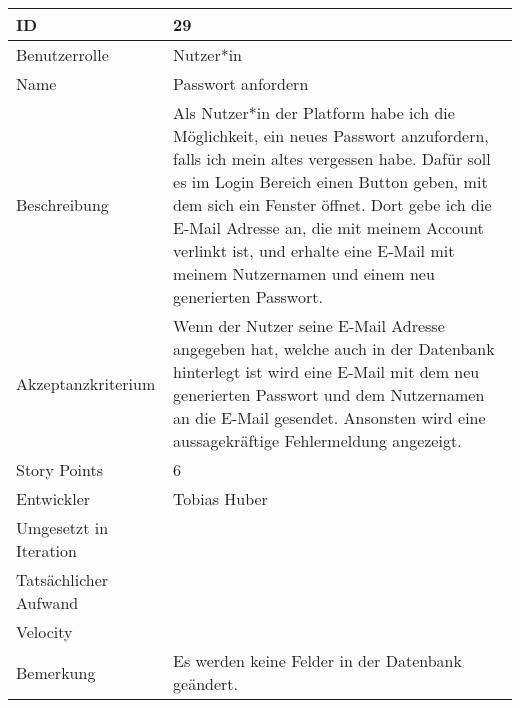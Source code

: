\begin{tabularx}{\textwidth}{|p{}|X|}
	\hline
	ID & 29 \\
	\hline
	Benutzerrolle & Nutzer*in \\
	\hline
	Name & Passwort anfordern\\
	\hline
	Beschreibung & Als Nutzer*in der Platform habe ich die Möglichkeit, ein neues Passwort anzufordern, falls ich mein altes vergessen habe. Dafür soll es im Login Bereich einen Button geben, mit dem sich ein Fenster öffnet. Dort gebe ich die E-Mail Adresse an, die mit meinem Account verlinkt ist, und erhalte eine E-Mail mit meinem Nutzernamen und einem neu generierten Passwort. \\
	\hline
	Akzeptanzkriterium & Wenn der Nutzer seine E-Mail Adresse angegeben hat, welche auch in der Datenbank hinterlegt ist wird eine E-Mail mit dem neu generierten Passwort und dem Nutzernamen an die E-Mail gesendet. Ansonsten wird eine aussagekräftige Fehlermeldung angezeigt. \\
	\hline
	Story Points & 6\\
	\hline
	Entwickler & Tobias Huber\\
	\hline
	Umgesetzt in Iteration & \\
	\hline
	Tatsächlicher Aufwand & \\
	\hline
	Velocity & \\
	\hline
	Bemerkung & Es werden keine Felder in der Datenbank geändert.\\
	\hline
\end{tabularx}
\vspace{20pt}
